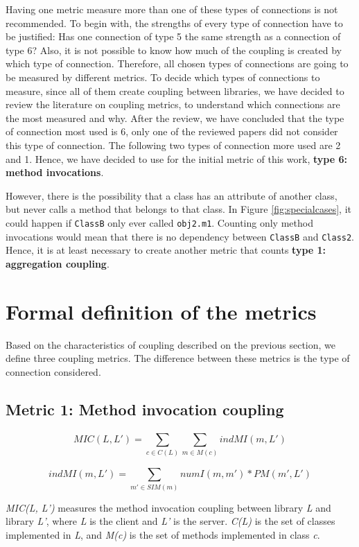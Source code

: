 \documentclass[a4paper]{article}
\begin{document}
Having one metric measure more than one of these types of connections is not recommended. To begin with, the strengths of every type of connection have to be justified: Has one connection of type 5 the same strength as a connection of type 6? Also, it is not possible to know how much of the coupling is created by which type of connection. Therefore, all chosen types of connections are going to be measured by different metrics. To decide which types of connections to measure, since all of them create coupling between libraries, we have decided to review the literature on coupling metrics, to understand which connections are the most measured and why. After the review, we have concluded that the type of connection most used is 6, only one of the reviewed papers did not consider this type of connection. The following two types of connection more used are 2 and 1. Hence, we have decided to use for the initial metric of this work, \textbf{type 6: method invocations}.

However, there is the possibility that a class has an attribute of another class, but never calls a method that belongs to that class. In Figure \ref{fig:specialcases}, it could happen if \texttt{ClassB} only ever called \texttt{obj2.m1}. Counting only method invocations would mean that there is no dependency between \texttt{ClassB} and \texttt{Class2}. Hence, it is at least necessary to create another metric that counts \textbf{type 1: aggregation coupling}.

\section{Formal definition of the metrics}
Based on the characteristics of coupling described on the previous section, we define three coupling metrics. The difference between these metrics is the type of connection considered.

\subsection{Metric 1: Method invocation coupling}
\[
  MIC(L, L') = \sum_{c \in C(L)}^{} \sum_{m \in M(c)}^{} indMI(m, L')
\]

\[
  indMI(m, L') = \sum_{m' \in SIM(m)}^{} numI(m, m')*PM(m', L')
\]

\textit{MIC(L, L')} measures the method invocation coupling between library \textit{L} and library \textit{L'}, where \textit{L} is the client and \textit{L'} is the server. \textit{C(L)} is the set of classes implemented in \textit{L}, and \textit{M(c)} is the set of methods implemented in class \textit{c}.
\end{document}
